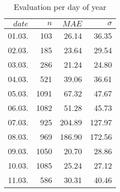 \begin{table}
  \centering
  \caption{Evaluation per day of year}
  \label{tab:eval_doy}
  \begin{tabular}{rrrr}
  \(date\) & \(n\) & \(MAE\) & \(\sigma\) \\
  \hline 
  01.03.   &  103  &   26.14 &  36.35 \\
  02.03.   &  185  &   23.64 &  29.54 \\
  03.03.   &  286  &   21.24 &  24.80 \\
  04.03.   &  521  &   39.06 &  36.61 \\
  05.03.   & 1091  &   67.32 &  47.67 \\
  06.03.   & 1082  &   51.28 &  45.73 \\
  07.03.   &  925  &  204.89 & 127.97 \\
  08.03.   &  969  &  186.90 & 172.56 \\
  09.03.   & 1050  &   20.70 &  28.86 \\
  10.03.   & 1085  &   25.24 &  27.12 \\
  11.03.   &  586  &   30.31 &  40.46 \\
  \end{tabular}
\end{table}
